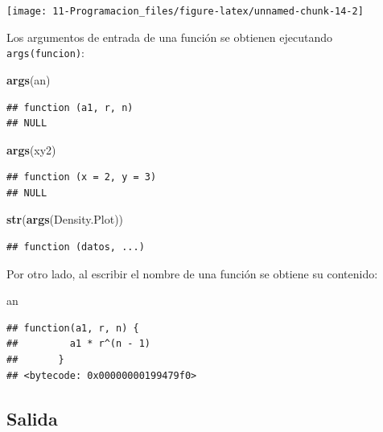\documentclass[]{book}
\newenvironment{Shaded}{\begin{snugshade}}{\end{snugshade}}
\newcommand{\KeywordTok}[1]{\textcolor[rgb]{0.13,0.29,0.53}{\textbf{#1}}}
\newcommand{\NormalTok}[1]{#1}
\begin{document}
\begin{center}\texttt{[image: 11-Programacion\_files/figure-latex/unnamed-chunk-14-2]} \end{center}

Los argumentos de entrada de una función se obtienen ejecutando
\texttt{args(funcion)}:

\begin{Shaded}
\begin{Highlighting}[]
\KeywordTok{args}\NormalTok{(an)}
\end{Highlighting}
\end{Shaded}

\begin{verbatim}
## function (a1, r, n) 
## NULL
\end{verbatim}

\begin{Shaded}
\begin{Highlighting}[]
\KeywordTok{args}\NormalTok{(xy2)}
\end{Highlighting}
\end{Shaded}

\begin{verbatim}
## function (x = 2, y = 3) 
## NULL
\end{verbatim}

\begin{Shaded}
\begin{Highlighting}[]
\KeywordTok{str}\NormalTok{(}\KeywordTok{args}\NormalTok{(Density.Plot))}
\end{Highlighting}
\end{Shaded}

\begin{verbatim}
## function (datos, ...)
\end{verbatim}

Por otro lado, al escribir el nombre de una función se obtiene su
contenido:

\begin{Shaded}
\begin{Highlighting}[]
\NormalTok{an}
\end{Highlighting}
\end{Shaded}

\begin{verbatim}
## function(a1, r, n) {
##         a1 * r^(n - 1)
##       }
## <bytecode: 0x00000000199479f0>
\end{verbatim}

\subsection{Salida}\label{salida}
\end{document}

